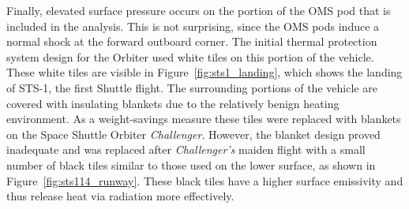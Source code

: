 Finally, elevated surface pressure occurs on the portion of the OMS pod that is included in the analysis.  This is not surprising, since the OMS pods induce a normal shock at the forward outboard corner.  The initial thermal protection system design for the Orbiter used white tiles on this portion of the vehicle.  These white tiles are visible in Figure~\ref{fig:sts1_landing}, which shows the landing of STS-1, the first Shuttle flight.  The surrounding portions of the vehicle are covered with insulating blankets due to the relatively benign heating environment.  As a weight-savings measure these tiles were replaced with blankets on the Space Shuttle Orbiter \emph{Challenger}.  However, the blanket design proved inadequate and was replaced after \emph{Challenger's} maiden flight with a small number of black tiles similar to those used on the lower surface, as shown in Figure~\ref{fig:sts114_runway}.  These black tiles have a higher surface emissivity and thus release heat via radiation more effectively.

